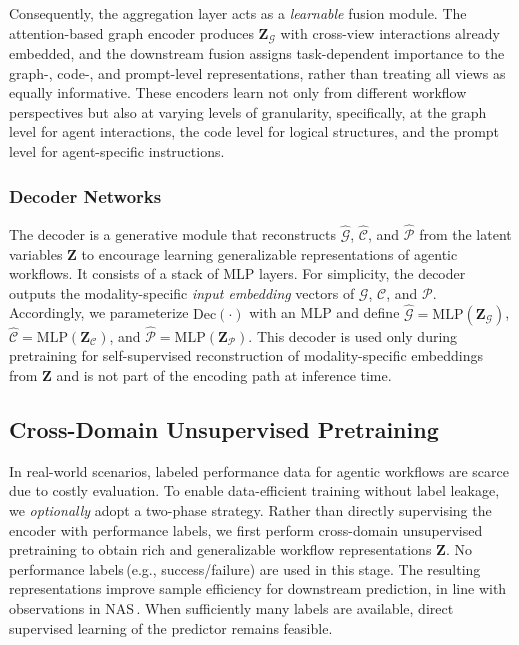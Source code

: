Consequently, the aggregation layer acts as a \emph{learnable} fusion module. The attention-based graph encoder produces $\mathbf{Z}_{\mathcal{G}}$ with cross-view interactions already embedded, and the downstream fusion assigns task-dependent importance to the graph-, code-, and prompt-level representations, rather than treating all views as equally informative. These encoders learn not only from different workflow perspectives but also at varying levels of granularity, specifically, at the graph level for agent interactions, the code level for logical structures, and the prompt level for agent-specific instructions. 

\subsubsection{Decoder Networks} 
The decoder is a generative module that reconstructs $\hat{\mathcal{G}}$, $\hat{\mathcal{C}}$, and $\hat{\mathcal{P}}$ from the latent variables $\mathbf{Z}$ to encourage learning generalizable representations of agentic workflows. It consists of a stack of MLP layers. For simplicity, the decoder outputs the modality-specific \emph{input embedding} vectors of $\mathcal{G}$, $\mathcal{C}$, and $\mathcal{P}$. Accordingly, we parameterize $\mathrm{Dec}(\cdot)$ with an MLP and define $\hat{\mathcal{G}}=\mathrm{MLP}(\mathbf{Z}_{\mathcal{G}})$, $\hat{\mathcal{C}}=\mathrm{MLP}(\mathbf{Z}_{\mathcal{C}})$, and $\hat{\mathcal{P}}=\mathrm{MLP}(\mathbf{Z}_{\mathcal{P}})$. This decoder is used only during pretraining for self-supervised reconstruction of modality-specific embeddings from $\mathbf{Z}$ and is not part of the encoding path at inference time.



\subsection{Cross-Domain Unsupervised Pretraining} \label{section:pretraining}
In real-world scenarios, labeled performance data for agentic workflows are scarce due to costly evaluation. To enable data-efficient training without label leakage, we \emph{optionally} adopt a two-phase strategy. Rather than directly supervising the encoder with performance labels, we first perform cross-domain unsupervised pretraining to obtain rich and generalizable workflow representations $\mathbf{Z}$. No performance labels\,(e.g., success/failure) are used in this stage. The resulting representations improve sample efficiency for downstream prediction, in line with observations in NAS\,\citep{EncodingNAS_NeurIPS_20, arch2vec_NeurIPS_20, CATE_ICML_21, FLAN_ICML_24, PASTA_TETCI_24}. When sufficiently many labels are available, direct supervised learning of the predictor remains feasible.



